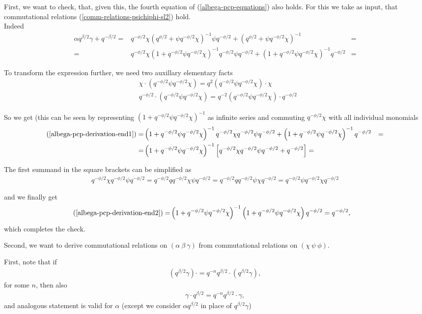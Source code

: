 \documentclass{article}
\newcommand{\lb}{\left (}
\newcommand{\rb}{\right )}
\newcommand{\lsb}{\left [}
\newcommand{\rsb}{\right ]}
\newcommand{\be}{\begin{eqnarray}}
\newcommand{\ee}{\end{eqnarray}}
\newcommand {\?}{\textit{???}}
\newcommand{\delabel}[1]{(\ref{#1})}
\begin{document}
First, we want to check, that, given this, the fourth equation of \delabel{albega-pcp-equations} also holds.
For this we take as input, that commutational relations \delabel{comm-relations-psichiphi-sl2} hold.
\\
Indeed
\def\qbHalf{\lb q^{\phi/2} + \psi q^{-\phi/2} \chi \rb}
\def\qbMinusHalf{\qbHalf^{-1}}
\def\qbHalfNorm{\lb 1 + q^{-\phi/2} \psi q^{-\phi/2} \chi \rb}
\def\qbMinusHalfNorm{\qbHalfNorm^{-1}}
\be
\alpha q^{\beta/2} \gamma + q^{-\beta/2}
= & q^{-\phi/2}\chi \qbMinusHalf \psi q^{-\phi/2}
+ \qbMinusHalf & = \nonumber \\
\label{albega-pcp-derivation-end1}
= & q^{-\phi/2} \chi \qbMinusHalfNorm q^{-\phi/2} \psi q^{-\phi/2} + \qbMinusHalfNorm q^{-\phi/2} & =
\ee

To transform the expression further, we need two auxillary elementary facts
\be
& \chi \cdot \lb q^{-\phi/2} \psi q^{-\phi/2} \chi \rb
= q^{2} \lb q^{-\phi/2}\psi q^{-\phi/2} \chi \rb \cdot \chi \nonumber \\
& q^{-\phi/2} \cdot \lb q^{-\phi/2} \psi q^{-\phi/2} \chi \rb
= q^{-2} \lb q^{-\phi/2}\psi q^{-\phi/2} \chi \rb \cdot q^{-\phi/2} \nonumber
\ee

So we get (this can be seen by representing $\qbMinusHalfNorm$ as infinite series and commuting $q^{-\phi/2}\chi$
with all individual monomials
\be
\delabel{albega-pcp-derivation-end1} = & \qbMinusHalfNorm q^{-\phi/2} \chi q^{-\phi/2} \psi q^{-\phi/2}
+ \qbMinusHalfNorm q^{-\phi/2} & = \nonumber \\
= & \qbMinusHalfNorm \lsb q^{-\phi/2} \chi q^{-\phi/2} \psi q^{-\phi/2} + q^{-\phi/2}\rsb = \label{albega-pcp-derivation-end2}
\ee

The first summand in the square brackets can be simplified as
\be
q^{-\phi/2} \chi q^{-\phi/2} \psi q^{-\phi/2} = q^{-\phi/2} q q^{-\phi/2} \chi \psi q^{-\phi/2}
= q^{-\phi/2} q q^{-\phi/2} \psi \chi q^{-\phi/2} = q^{-\phi/2} \psi q^{-\phi/2} \chi q^{-\phi/2} \nonumber
\ee

and we finally get
\be
\delabel{albega-pcp-derivation-end2} = & \qbMinusHalfNorm \qbHalfNorm q^{-\phi/2} = q^{-\phi/2},
\ee
which completes the check.


Second, we want to derive commutational relations on $(\alpha\ \beta\ \gamma)$ from commutational
relations on $(\chi\ \psi\ \phi)$.

First, note that if
\be
\lb q^{\beta/2}\gamma \rb \cdot = q^{-n} q^{\beta/2} \cdot \lb q^{\beta/2}\gamma \rb,
\ee
for some $n$, then also
\be
 \gamma \cdot q^{\beta/2} = q^{-n} q^{\beta/2} \cdot \gamma,
\ee
and analogous statement is valid for $\alpha$
 (except we consider $\alpha q^{\beta/2}$ in place of $q^{\beta/2} \gamma$) 
\end{document}
